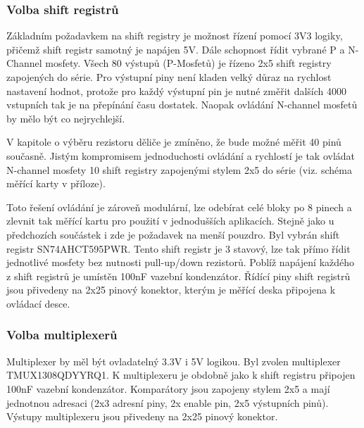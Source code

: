 \subsubsection{Volba shift registrů}
Základním požadavkem na shift registry je možnost řízení pomocí 3V3 logiky, přičemž shift registr samotný je napájen 5V.
Dále schopnost řídit vybrané P a N-Channel mosfety. Všech 80 výstupů (P-Mosfetů) je řízeno 2x5 shift registry zapojených do série.
Pro výstupní piny není kladen velký důraz na rychlost nastavení hodnot,
protože pro každý výstupní pin je nutné změřit dalších 4000 vstupních tak je na přepínání času dostatek.
Naopak ovládání N-channel mosfetů by mělo být co nejrychlejší.\par

V kapitole o výběru rezistoru děliče je zmíněno, že bude možné měřit 40 pinů současně.
Jistým kompromisem jednoduchosti ovládání a rychlostí je tak ovládat N-channel mosfety 10 shift
registry zapojenými stylem 2x5 do série (viz. schéma měřící karty v příloze).\par

Toto řešení ovládání je zároveň modulární, lze odebírat celé bloky po 8 pinech a
zlevnit tak měřící kartu pro použití v jednodušších aplikacích. Stejně jako u předchozích součástek i zde
je požadavek na menší pouzdro. Byl vybrán shift registr SN74AHCT595PWR.
Tento shift registr je 3 stavový, lze tak přímo řídit jednotlivé mosfety bez nutnosti
pull-up/down rezistorů. Poblíž napájení každého z shift registrů je umístěn 100nF vazební kondenzátor.
Řídící piny shift registrů jsou přivedeny na 2x25 pinový konektor,
kterým je měřící deska připojena k ovládací desce\cite{shift_datasheet}.

\subsubsection{Volba multiplexerů}
Multiplexer by měl být ovladatelný 3.3V i 5V logikou. Byl zvolen multiplexer \linebreak TMUX1308QDYYRQ1.
K multiplexeru je obdobně jako k shift registru připojen 100nF vazební kondenzátor.
Komparátory jsou zapojeny stylem 2x5 a mají jednotnou adresaci (2x3 adresní piny, 2x enable pin, 2x5 výstupních pinů).
Výstupy multiplexeru jsou přivedeny na 2x25 pinový konektor\cite{mux_datasheet}.

